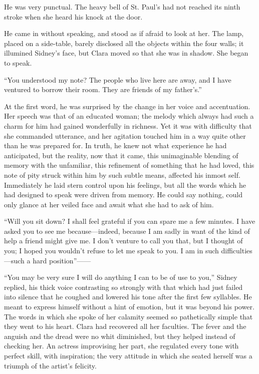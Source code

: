 He was very punctual. The heavy bell of St. Paul's had not reached its
ninth stroke when she heard his knock at the door.

He came in without speaking, and stood as if afraid to look at her. The
lamp, placed on a side-table, barely disclosed all the objects within
the four walls; it illumined Sidney's face, but Clara moved so that she
was in shadow. She began to speak.

``You understood my note? The people who live here are away, and I have
ventured to borrow their room. They are friends of my father's.''

At the first word, he was surprised by the change in her voice and
accentuation. Her speech was that of an educated woman; the melody which
always had such a charm for him had gained wonderfully in richness. Yet
it was with difficulty that she commanded utterance, and her agitation
touched him in a way quite other than he was prepared for. In
{\protect\hypertarget{79}{}{}}truth, he knew not what experience he had
anticipated, but the reality, now that it came, this unimaginable
blending of memory with the unfamiliar, this refinement of something
that he had loved, this note of pity struck within him by such subtle
means, affected his inmost self. Immediately he laid stern control upon
his feelings, but all the words which he had designed to speak were
driven from memory. He could say nothing, could only glance at her
veiled face and await what she had to ask of him.

``Will you sit down? I shall feel grateful if you can spare me a few
minutes. I have asked you to see me because---indeed, because I am sadly
in want of the kind of help a friend might give me. I don't venture to
call you that, but I thought of you; I hoped you wouldn't refuse to let
me speak to you. I am in such difficulties---such a hard
position''{{------}}

``You may be very sure I will do anything I can to be of use to you,''
Sidney replied, his thick voice contrasting so strongly with that which
had just failed into silence that he coughed and lowered his tone after
the first few syllables. He meant to express himself
{\protect\hypertarget{80}{}{}}without a hint of emotion, but it was
beyond his power. The words in which she spoke of her calamity seemed so
pathetically simple that they went to his heart. Clara had recovered all
her faculties. The fever and the anguish and the dread were no whit
diminished, but they helped instead of checking her. An actress
improvising her part, she regulated every tone with perfect skill, with
inspiration; the very attitude in which she seated herself was a triumph
of the artist's felicity.

